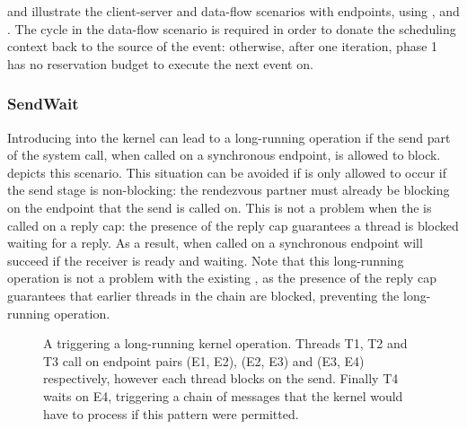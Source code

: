  and  illustrate the client-server and data-flow scenarios with endpoints, using \call, \replywait and \sendwait.
The cycle in the data-flow scenario is required in order to donate the scheduling context back to the source of the event: otherwise, after one iteration, phase 1 has no reservation budget to execute the next event on.

\subsubsection{SendWait}

Introducing \sendwait into the kernel can lead to a long-running operation if the send part of the system call, when called on a synchronous endpoint, is allowed to block.
 depicts this scenario.
This situation can be avoided if \sendwait is only allowed to occur if the send stage is non-blocking: the rendezvous partner must already be blocking on the endpoint that the send is called on.
This is not a problem when the \sendwait is called on a reply cap: the presence of the reply cap guarantees a thread is blocked waiting for a reply.
As a result, \sendwait when called on a synchronous endpoint will succeed if the receiver is ready and waiting.
Note that this long-running operation is not a problem with the existing \call, as the presence of the reply cap guarantees that earlier threads in the chain are blocked, preventing the long-running operation.

\begin{figure}
\centering
\caption{A \sendwait triggering a long-running kernel operation. Threads T1, T2 and T3 call \sendwait on endpoint pairs (E1, E2), (E2, E3) and (E3, E4) respectively, however each thread blocks on the send. Finally T4 waits on E4, triggering a chain of messages that the kernel would have to process if this pattern were permitted.}
\label{fig:sendwait-chain}
\end{figure}

